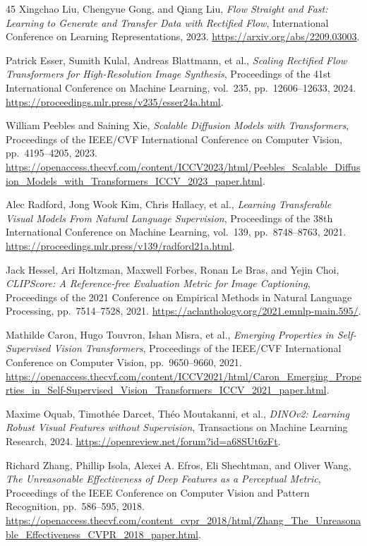 \documentclass[conference]{IEEEtran}
\begin{document}
\begin{thebibliography}{45}
Xingchao Liu, Chengyue Gong, and Qiang Liu,
\textit{Flow Straight and Fast: Learning to Generate and Transfer Data with Rectified Flow},
International Conference on Learning Representations, 2023.
\url{https://arxiv.org/abs/2209.03003}.

Patrick Esser, Sumith Kulal, Andreas Blattmann, et al.,
\textit{Scaling Rectified Flow Transformers for High-Resolution Image Synthesis},
Proceedings of the 41st International Conference on Machine Learning, vol.~235, pp.~12606--12633, 2024.
\url{https://proceedings.mlr.press/v235/esser24a.html}.

William Peebles and Saining Xie,
\textit{Scalable Diffusion Models with Transformers},
Proceedings of the IEEE/CVF International Conference on Computer Vision, pp.~4195--4205, 2023.
\url{https://openaccess.thecvf.com/content/ICCV2023/html/Peebles_Scalable_Diffusion_Models_with_Transformers_ICCV_2023_paper.html}.

Alec Radford, Jong Wook Kim, Chris Hallacy, et al.,
\textit{Learning Transferable Visual Models From Natural Language Supervision},
Proceedings of the 38th International Conference on Machine Learning, vol.~139, pp.~8748--8763, 2021.
\url{https://proceedings.mlr.press/v139/radford21a.html}.

Jack Hessel, Ari Holtzman, Maxwell Forbes, Ronan Le Bras, and Yejin Choi,
\textit{CLIPScore: A Reference-free Evaluation Metric for Image Captioning},
Proceedings of the 2021 Conference on Empirical Methods in Natural Language Processing, pp.~7514--7528, 2021.
\url{https://aclanthology.org/2021.emnlp-main.595/}.

Mathilde Caron, Hugo Touvron, Ishan Misra, et al.,
\textit{Emerging Properties in Self-Supervised Vision Transformers},
Proceedings of the IEEE/CVF International Conference on Computer Vision, pp.~9650--9660, 2021.
\url{https://openaccess.thecvf.com/content/ICCV2021/html/Caron_Emerging_Properties_in_Self-Supervised_Vision_Transformers_ICCV_2021_paper.html}.

Maxime Oquab, Timoth\'ee Darcet, Th\'eo Moutakanni, et al.,
\textit{DINOv2: Learning Robust Visual Features without Supervision},
Transactions on Machine Learning Research, 2024.
\url{https://openreview.net/forum?id=a68SUt6zFt}.

Richard Zhang, Phillip Isola, Alexei A. Efros, Eli Shechtman, and Oliver Wang,
\textit{The Unreasonable Effectiveness of Deep Features as a Perceptual Metric},
Proceedings of the IEEE Conference on Computer Vision and Pattern Recognition, pp.~586--595, 2018.
\url{https://openaccess.thecvf.com/content_cvpr_2018/html/Zhang_The_Unreasonable_Effectiveness_CVPR_2018_paper.html}.


\end{thebibliography}
\end{document}
